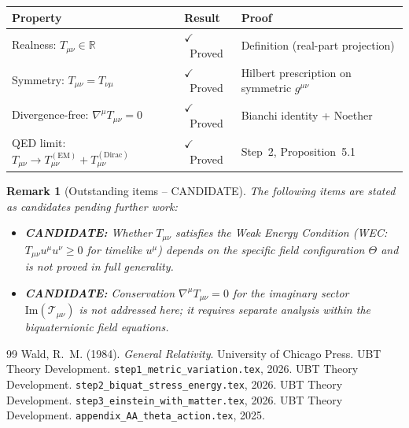 \documentclass[12pt]{article}
\newtheorem{remark}[definition]{Remark}
\newcommand{\im}{\mathrm{Im}}
\begin{document}
\begin{center}
\renewcommand{\arraystretch}{1.4}
\begin{tabular}{|l|l|l|}
\hline
\textbf{Property} & \textbf{Result} & \textbf{Proof} \\
\hline
Realness: $T_{\mu\nu} \in \mathbb{R}$
  & $\checkmark$~Proved
  & Definition (real-part projection) \\
\hline
Symmetry: $T_{\mu\nu} = T_{\nu\mu}$
  & $\checkmark$~Proved
  & Hilbert prescription on symmetric $g^{\mu\nu}$ \\
\hline
Divergence-free: $\nabla^\mu T_{\mu\nu} = 0$
  & $\checkmark$~Proved
  & Bianchi identity + Noether \\
\hline
QED limit: $T_{\mu\nu} \to T^{(\mathrm{EM})}_{\mu\nu} + T^{(\mathrm{Dirac})}_{\mu\nu}$
  & $\checkmark$~Proved
  & Step~2, Proposition~5.1 \\
\hline
\end{tabular}
\end{center}

\begin{remark}[Outstanding items -- CANDIDATE]
\label{rem:candidate}
The following items are stated as candidates pending further work:
\begin{itemize}
  \item \textbf{CANDIDATE:} Whether $T_{\mu\nu}$ satisfies the Weak Energy
        Condition (WEC: $T_{\mu\nu}u^\mu u^\nu \geq 0$ for timelike $u^\mu$)
        depends on the specific field configuration $\Theta$ and is not
        proved in full generality.
  \item \textbf{CANDIDATE:} Conservation $\nabla^\mu T_{\mu\nu} = 0$ for
        the imaginary sector $\im(\mathcal{T}_{\mu\nu})$ is not addressed
        here; it requires separate analysis within the biquaternionic
        field equations.
\end{itemize}
\end{remark}

\begin{thebibliography}{99}
    Wald, R.~M. (1984). \textit{General Relativity}.
                  University of Chicago Press.
   UBT Theory Development.
                  \texttt{step1\_metric\_variation.tex}, 2026.
   UBT Theory Development.
                  \texttt{step2\_biquat\_stress\_energy.tex}, 2026.
   UBT Theory Development.
                  \texttt{step3\_einstein\_with\_matter.tex}, 2026.
                  UBT Theory Development.
                  \texttt{appendix\_AA\_theta\_action.tex}, 2025.
\end{thebibliography}
\end{document}

